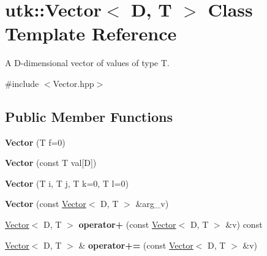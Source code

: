\hypertarget{classutk_1_1Vector}{\section{utk\-:\-:Vector$<$ D, T $>$ Class Template Reference}
\label{classutk_1_1Vector}
}


A D-\/dimensional vector of values of type T.  




{\ttfamily \#include $<$Vector.\-hpp$>$}

\subsection*{Public Member Functions}
\begin{DoxyCompactItemize}
\item 
\hypertarget{classutk_1_1Vector_af835ce1423f91fc3368a8ff1056d2149}{{\bfseries Vector} (T f=0)}\label{classutk_1_1Vector_af835ce1423f91fc3368a8ff1056d2149}

\item 
\hypertarget{classutk_1_1Vector_aa18e15a91b22df08ccf3ab81a7c509b0}{{\bfseries Vector} (const T val\mbox{[}D\mbox{]})}\label{classutk_1_1Vector_aa18e15a91b22df08ccf3ab81a7c509b0}

\item 
\hypertarget{classutk_1_1Vector_a4ef62c8a3d99c1267bc337832db01fdc}{{\bfseries Vector} (T i, T j, T k=0, T l=0)}\label{classutk_1_1Vector_a4ef62c8a3d99c1267bc337832db01fdc}

\item 
\hypertarget{classutk_1_1Vector_a353195f5d9a7f28178387dc96056387f}{{\bfseries Vector} (const \hyperlink{classutk_1_1Vector}{Vector}$<$ D, T $>$ \&arg\-\_\-v)}\label{classutk_1_1Vector_a353195f5d9a7f28178387dc96056387f}

\item 
\hypertarget{classutk_1_1Vector_a431fcd5a1eb0ded1c89fcf1785378d16}{\hyperlink{classutk_1_1Vector}{Vector}$<$ D, T $>$ {\bfseries operator+} (const \hyperlink{classutk_1_1Vector}{Vector}$<$ D, T $>$ \&v) const }\label{classutk_1_1Vector_a431fcd5a1eb0ded1c89fcf1785378d16}

\item 
\hypertarget{classutk_1_1Vector_a29574556883ea1d820c84e3aa0720d7f}{\hyperlink{classutk_1_1Vector}{Vector}$<$ D, T $>$ \& {\bfseries operator+=} (const \hyperlink{classutk_1_1Vector}{Vector}$<$ D, T $>$ \&v)}\label{classutk_1_1Vector_a29574556883ea1d820c84e3aa0720d7f}


\end{DoxyCompactItemize}
